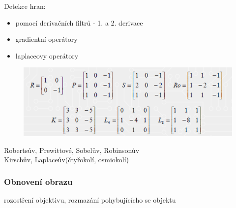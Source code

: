 Detekce hran:
\begin{itemize}
    \item pomocí derivačních filtrů - 1. a 2. derivace
    \item gradientní operátory
    \item laplaceovy operátory
\end{itemize}
\begin{figure}[H]
    \includegraphics[scale = 0.7]{images/hrany.png}
\end{figure}
Robertsův, Prewittové, Sobelův, Robinsonův\\
Kirschův, Laplaceův(čtyřokolí, osmiokolí)\\

\subsubsection{Obnovení obrazu}
rozostření objektivu, rozmazání pohybujícícho se objektu\\

